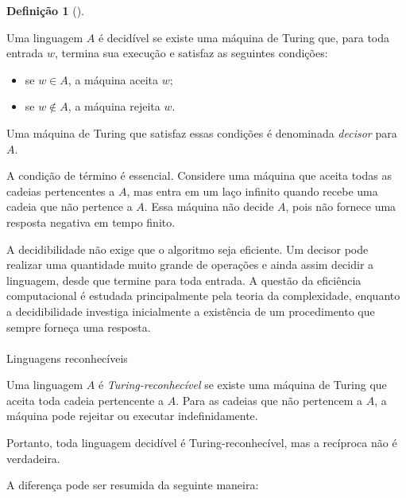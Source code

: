 \documentclass[
  brazilian,
  letterpaper,
]{book}
\makeatletter
\let\oldparagraph\paragraph
\renewcommand{\paragraph}{
    \@ifstar
      \xxxParagraphStar
      \xxxParagraphNoStar
  }
\newcommand{\xxxParagraphStar}[1]{\oldparagraph*{#1}\mbox{}}
\newcommand{\xxxParagraphNoStar}[1]{\oldparagraph{#1}\mbox{}}
\providecommand{\tightlist}{%
  \setlength{\itemsep}{0pt}\setlength{\parskip}{0pt}}
\theoremstyle{plain}
\theoremstyle{definition}
\newtheorem{definition}{Definição}[chapter]
\theoremstyle{remark}
\makeatother
\begin{document}
\begin{definition}[]\protect\hypertarget{def-decidivel}{}\label{def-decidivel}

Uma linguagem \(A\) é decidível se existe uma máquina de Turing que,
para toda entrada \(w\), termina sua execução e satisfaz as seguintes
condições:

\begin{itemize}
\tightlist
\item
  se \(w\in A\), a máquina aceita \(w\);
\item
  se \(w\notin A\), a máquina rejeita \(w\).
\end{itemize}

\end{definition}

Uma máquina de Turing que satisfaz essas condições é denominada
\emph{decisor} para \(A\).

A condição de término é essencial. Considere uma máquina que aceita
todas as cadeias pertencentes a \(A\), mas entra em um laço infinito
quando recebe uma cadeia que não pertence a \(A\). Essa máquina não
decide \(A\), pois não fornece uma resposta negativa em tempo finito.

A decidibilidade não exige que o algoritmo seja eficiente. Um decisor
pode realizar uma quantidade muito grande de operações e ainda assim
decidir a linguagem, desde que termine para toda entrada. A questão da
eficiência computacional é estudada principalmente pela teoria da
complexidade, enquanto a decidibilidade investiga inicialmente a
existência de um procedimento que sempre forneça uma resposta.

\paragraph{Linguagens reconhecíveis}\label{linguagens-reconhecuxedveis}

Uma linguagem \(A\) é \emph{Turing-reconhecível} se existe uma máquina
de Turing que aceita toda cadeia pertencente a \(A\). Para as cadeias
que não pertencem a \(A\), a máquina pode rejeitar ou executar
indefinidamente.

Portanto, toda linguagem decidível é Turing-reconhecível, mas a
recíproca não é verdadeira.

A diferença pode ser resumida da seguinte maneira:
\end{document}
